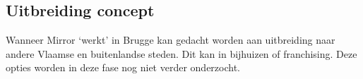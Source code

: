 \subsection{Uitbreiding concept} %
\label{sub:uitbreiding_concept}
Wanneer Mirror `werkt' in Brugge kan gedacht worden aan uitbreiding naar andere Vlaamse en buitenlandse  steden. Dit kan in bijhuizen of franchising. Deze opties worden in deze fase nog niet verder onderzocht.


